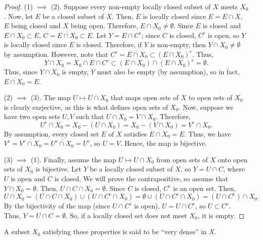 \begin{proof}
(1) $\implies$ (2). Suppose every non-empty locally closed subset of $X$ meets $X_0$. Now, let $E$ be a closed subset of $X$. Then, $E$ is locally
closed since $E = E \cap X$, $E$ being closed and $X$ being open. Therefore, $E \cap X_0 \neq \emptyset$. Since $E$ is closed and $E \cap X_0 \subset E$,
$C = \overline{E \cap X_0} \subset E$. Let $Y = E \cap C^c$; since $C$ is closed, $C^c$ is open, so $Y$ is locally closed since $E$ is closed. Therefore,
if $Y$ is non-empty, then $Y \cap X_0 \neq \emptyset$ by assumption. However, note that $C^c = \overline{E \cap X_0} \subset (E \cap X_0)^c$. Thus,
$$Y \cap X_0 = X_0 \cap E \cap C^c \subset (E \cap X_0) \cap (E \cap X_0)^c = \emptyset.$$
Thus, since $Y \cap X_0$ is empty, $Y$ must also be empty (by assumption), so in fact, $\overline{E \cap X_0} = E$.

(2) $\implies$ (3). The map $U \mapsto U \cap X_0$ that maps open sets of $X$ to open sets of $X_0$ is clearly surjective, as this is what defines open sets
of $X_0$. Now, suppose we have two open sets $U,V$ such that $U \cap X_0 = V \cap X_0$. Therefore, 
$$U^c \cap X_0 = X_0 - (U \cap X_0) = X_0 - (V \cap X_0) = V^c \cap X_0.$$ 
By assumption, every closed set $E$ of $X$ satisfies $\overline{E \cap X_0} = E$. Thus, we have
$V^c = \overline{V^c \cap X_0} = \overline{U^c \cap X_0} = U^c$, so $U = V$. Hence, the map is bijective.

(3) $\implies$ (1). Finally, assume the map $U \mapsto U \cap X_0$ from open sets of $X$ onto open sets of $X_0$ is bijective. Let $Y$ be a locally closed
subset of $X$, so $Y = U \cap C$, where $U$ is open and $C$ is closed. We will prove the contrapositive, so assume that $Y \cap X_0 = \emptyset$. Then, 
$U \cap C \cap X_0 = \emptyset$. Since $C$ is closed, $C^c$ is an open set. Then, 
$$U \cap X_0 = (U \cap C \cap X_0) \cup (U \cap C^c \cap X_0) = \emptyset \cup (U \cap C^c \cap X_0) = (U \cap C^c) \cap X_0.$$
By the bijectivity of the map (since $U \cap C^c$ is open), $U = U \cap C^c$, so $U \subset C^c$. Thus, $Y = U \cap C = \emptyset$. So, if a locally closed
set does not meet $X_0$, it is empty.
\end{proof}

\begin{remark}
A subset $X_0$ satisfying these properties is said to be ``very dense'' in $X$.
\end{remark}

